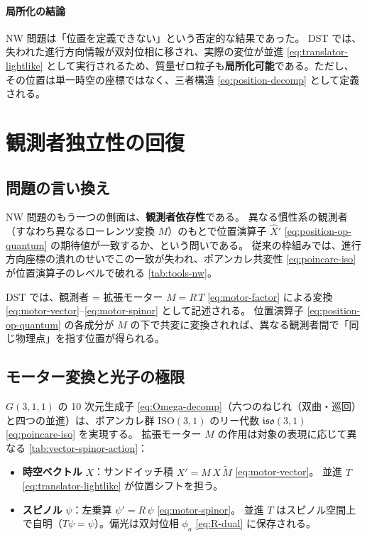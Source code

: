 \documentclass[dvipdfmx,a4paper,oneside]{jsbook}
\numberwithin{equation}{chapter}
\begin{document}
\paragraph{局所化の結論}
NW 問題は「位置を定義できない」という否定的な結果であった。
DST では、失われた進行方向情報が双対位相に移され、実際の変位が並進 \eqref{eq:translator-lightlike} として実行されるため、質量ゼロ粒子も\textbf{局所化可能}である。ただし、その位置は単一時空の座標ではなく、三者構造 \eqref{eq:position-decomp} として定義される。

\section{観測者独立性の回復}

\subsection{問題の言い換え}

NW 問題のもう一つの側面は、\textbf{観測者依存性}である。
異なる慣性系の観測者（すなわち異なるローレンツ変換 \(M\)）のもとで位置演算子 \(\hat{X}'\) \eqref{eq:position-op-quantum} の期待値が一致するか、という問いである。
従来の枠組みでは、進行方向座標の潰れのせいでこの一致が失われ、ポアンカレ共変性 \eqref{eq:poincare-iso} が位置演算子のレベルで破れる \eqref{tab:tools-nw}。

DST では、観測者 = 拡張モーター \(M = R\,T\) \eqref{eq:motor-factor} による変換 \eqref{eq:motor-vector}–\eqref{eq:motor-spinor} として記述される。
位置演算子 \eqref{eq:position-op-quantum} の各成分が \(M\) の下で共変に変換されれば、異なる観測者間で「同じ物理点」を指す位置が得られる。

\subsection{モーター変換と光子の極限}

\(G(3,1,1)\) の 10 次元生成子 \eqref{eq:Omega-decomp}（六つのねじれ（双曲・巡回）と四つの並進）は、ポアンカレ群 \(\mathrm{ISO}(3,1)\) のリー代数 \(\mathfrak{iso}(3,1)\) \eqref{eq:poincare-iso} を実現する。
拡張モーター \(M\) の作用は対象の表現に応じて異なる \eqref{tab:vector-spinor-action}：

\begin{itemize}[leftmargin=2em]
  \item \textbf{時空ベクトル} \(X\)：サンドイッチ積 \(X' = M\,X\,\widetilde{M}\) \eqref{eq:motor-vector}。
  並進 \(T\) \eqref{eq:translator-lightlike} が位置シフトを担う。
  \item \textbf{スピノル} \(\psi\)：左乗算 \(\psi' = R\,\psi\) \eqref{eq:motor-spinor}。
  並進 \(T\) はスピノル空間上で自明（\(T\psi = \psi\)）。偏光は双対位相 \(\phi_a\) \eqref{eq:R-dual} に保存される。
\end{itemize}
\end{document}
